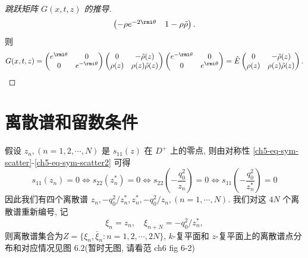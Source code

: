 \begin{proof}[跳跃矩阵 $G(x,t,z)$ 的推导]
\begin{equation}
\begin{pmatrix}
            -\rho e^{-2 \rmi \theta} & 1 - \rho \tilde{\rho}
        \end{pmatrix}.
    \end{equation}
    则
    \begin{equation}
        G(x,t,z)  = \begin{pmatrix} e^{\rmi \theta} & 0 \\ 0 & e^{-\rmi \theta} \end{pmatrix}
        \begin{pmatrix} 0 & -\tilde{\rho}(z) \\ \rho(z) & \rho(z) \tilde{\rho}(z) \end{pmatrix}
        \begin{pmatrix} e^{-\rmi \theta} & 0 \\ 0 & e^{\rmi \theta} \end{pmatrix}
        = \hat{E} \begin{pmatrix} 0 & -\tilde{\rho}(z) \\ \rho(z) & \rho(z) \tilde{\rho}(z) \end{pmatrix}.
    \end{equation}
\end{proof}
\section{离散谱和留数条件}
假设 $z_{n}, (n= 1, 2, \cdots, N)$ 是 $ s_{11}(z) $ 在 $D^{+}$ 上的零点, 则由对称性 \eqref{ch5-eq-sym-scatter}-\eqref{ch5-eq-sym-scatter2} 可得
\begin{equation}
    s_{11}(z_{n}) = 0 \iff s_{22}(z_{n}^{*}) = 0 \iff s_{22}(-\frac{q_{0}^{2}}{z_{n}}) = 0 \iff s_{11}(-\frac{q_{0}^{2}}{z_{n}^{*}}) = 0
\end{equation}
因此我们有四个离散谱 $ z_{n}, -q_{0}^{2}/z_{n}^{*}, z_{n}^{*}, -q_{0}^{2}/z_{n}, (n = 1, \cdots, N)$. 我们对这 $4N$ 个离散谱重新编号, 记
\begin{equation}
    \xi_{n} = z_{n}, \quad \xi_{n+N} = -q_{0}^{2}/z_{n}^{*},
\end{equation}
则离散谱集合为$Z = \{\xi_{n}, \bar{\xi}_{n} : n = 1, 2, \cdots, 2N \} $, $k$-复平面和 $ z$-复平面上的离散谱点分布和对应情况见图 6.2(暂时无图, 请看范 ch6 fig 6-2)

